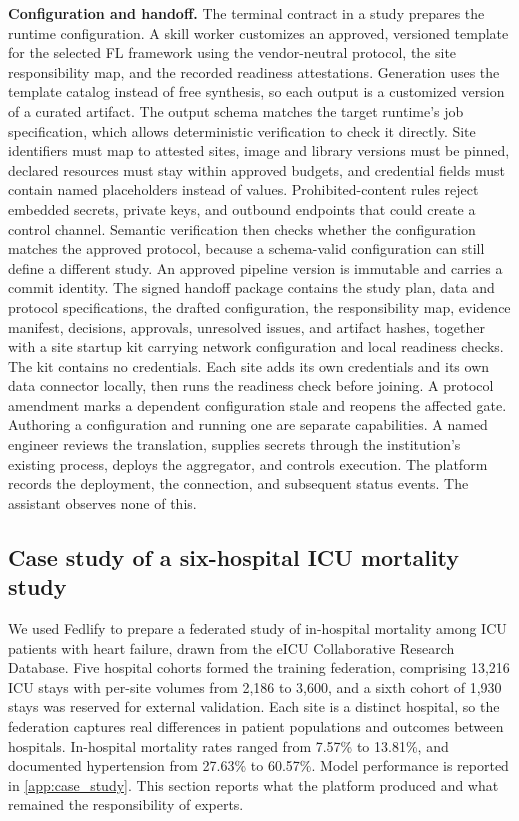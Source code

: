 \documentclass[preprint,5p, 10pt, times]{elsarticle}
\begin{document}
\textbf{Configuration and handoff.}
The terminal contract in a study prepares the runtime configuration. A skill worker customizes an approved, versioned template for the selected FL framework using the vendor-neutral protocol, the site responsibility map, and the recorded readiness attestations.
%
Generation uses the template catalog instead of free synthesis, so each output is a customized version of a curated artifact. The output schema matches the target runtime’s job specification, which allows deterministic verification to check it directly. Site identifiers must map to attested sites, image and library versions must be pinned, declared resources must stay within approved budgets, and credential fields must contain named placeholders instead of values. Prohibited-content rules reject embedded secrets, private keys, and outbound endpoints that could create a control channel. Semantic verification then checks whether the configuration matches the approved protocol, because a schema-valid configuration can still define a different study.
%
%
An approved pipeline version is immutable and carries a commit identity. The signed handoff package contains the study plan, data and protocol specifications, the drafted configuration, the responsibility map, evidence manifest, decisions, approvals, unresolved issues, and artifact hashes, together with a site startup kit carrying network configuration and local readiness checks. The kit contains no credentials. Each site adds its own credentials and its own data connector locally, then runs the readiness check before joining. A protocol amendment marks a dependent configuration stale and reopens the affected gate.
%
Authoring a configuration and running one are separate capabilities. A named engineer reviews the translation, supplies secrets through the institution's existing process, deploys the aggregator, and controls execution. The platform records the deployment, the connection, and subsequent status events. The assistant observes none of this.

\subsection*{Case study of a six-hospital ICU mortality study}

We used Fedlify to prepare a federated study of in-hospital mortality among ICU patients with heart failure, drawn from the eICU Collaborative Research Database\cite{PhysioNet-eicu-crd-2.0}.
Five hospital cohorts formed the training federation, comprising 13,216 ICU stays with per-site volumes from 2,186 to 3,600, and a sixth cohort of 1,930 stays was reserved for external validation.
Each site is a distinct hospital, so the federation captures real differences in patient populations and outcomes between hospitals.
%
In-hospital mortality rates ranged from 7.57\% to 13.81\%, and documented hypertension from 27.63\% to 60.57\%. Model performance is reported in \ref{app:case_study}.
%
This section reports what the platform produced and what remained the responsibility of experts. 
\end{document}
